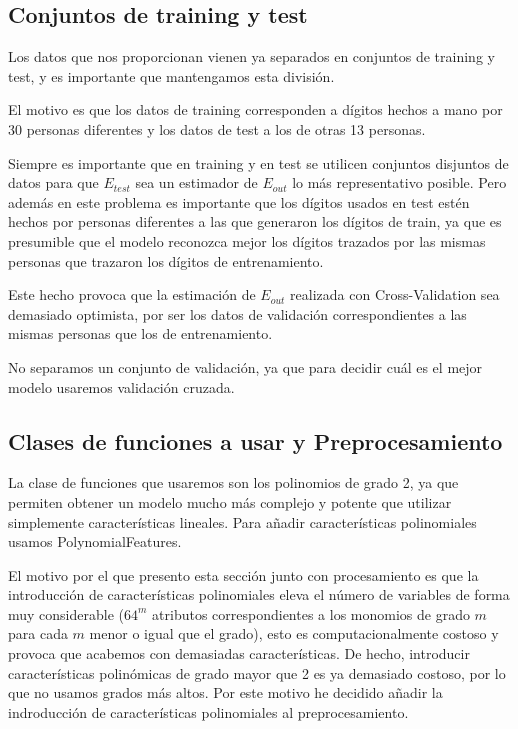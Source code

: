\documentclass[a4]{article}
\begin{document}
\subsection{Conjuntos de training y test}

Los datos que nos proporcionan vienen ya separados en conjuntos de
training y test, y es importante que mantengamos esta división.

El motivo es que los datos de training corresponden a dígitos hechos a
mano por 30 personas diferentes y los datos de test a los de otras 13
personas.

Siempre es importante que en training y en test se utilicen conjuntos
disjuntos de datos para que $E_{test}$ sea un estimador de $E_{out}$
lo más representativo posible. Pero además en este problema es
importante que los dígitos usados en test estén hechos por personas
diferentes a las que generaron los dígitos de train, ya que es
presumible que el modelo reconozca mejor los dígitos trazados por las
mismas personas que trazaron los dígitos de entrenamiento.

Este hecho provoca que la estimación de $E_{out}$ realizada con
Cross-Validation sea demasiado optimista, por ser los datos de
validación correspondientes a las mismas personas que los de
entrenamiento. \label{cv-optimistic}

No separamos un conjunto de validación, ya que para decidir cuál es el
mejor modelo usaremos validación cruzada.

\subsection{Clases de funciones a usar y Preprocesamiento}

La clase de funciones que usaremos son los polinomios de grado 2, ya
que permiten obtener un modelo mucho más complejo y potente que
utilizar simplemente características lineales. Para añadir
características polinomiales usamos PolynomialFeatures.

El motivo por el que presento esta sección junto con procesamiento es
que la introducción de características polinomiales eleva el número de
variables de forma muy considerable ($64^m$ atributos correspondientes
a los monomios de grado $m$ para cada $m$ menor o igual que el grado),
esto es computacionalmente costoso y provoca que acabemos con
demasiadas características. De hecho, introducir características
polinómicas de grado mayor que 2 es ya demasiado costoso, por lo que
no usamos grados más altos. Por este motivo he decidido añadir la
indroducción de características polinomiales al preprocesamiento.
\end{document}
